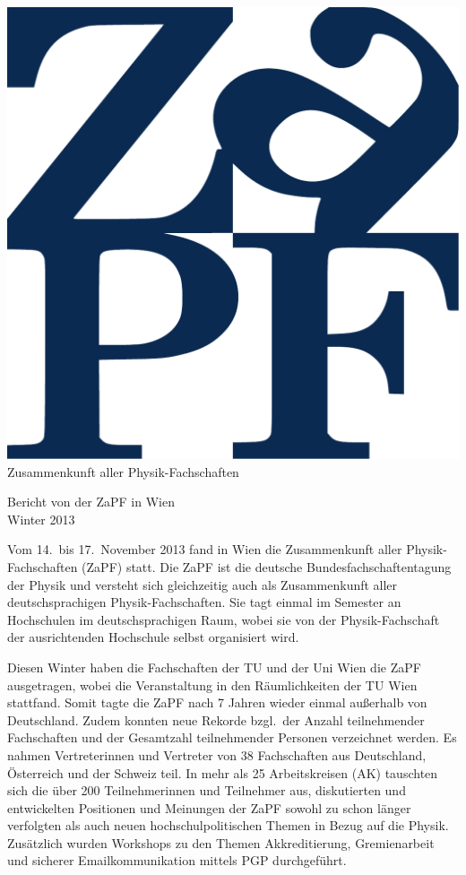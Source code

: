 \documentclass{scrartcl}
\begin{document}
\hspace{0.74\textwidth}
\begin{minipage}{0.25\textwidth}
\vspace{-1cm}
\centering
\includegraphics[width=.89\textwidth]{logo.pdf}
\small Zusammenkunft aller Physik-Fachschaften
\end{minipage}
 
\begin{center}
\vspace{1.5cm}
\huge{Bericht von der ZaPF in Wien \\ Winter 2013} 
\vspace{1cm}
\end{center}

Vom 14.\ bis 17.\ November 2013 fand in Wien die Zusammenkunft aller Physik-Fachschaften (ZaPF) statt. Die ZaPF ist die deutsche Bundesfachschaftentagung der Physik und versteht sich gleichzeitig auch als Zusammenkunft aller deutschsprachigen Physik-Fachschaften. Sie tagt einmal im Semester an Hochschulen im deutschsprachigen Raum, wobei sie von der  Physik-Fachschaft der ausrichtenden Hochschule selbst organisiert wird.

Diesen Winter haben die Fachschaften der TU und der Uni Wien die ZaPF ausgetragen, wobei die Veranstaltung in den R\"aumlichkeiten der TU Wien stattfand. Somit tagte die ZaPF nach 7 Jahren wieder einmal au\ss erhalb von Deutschland. Zudem konnten neue Rekorde bzgl.\ der Anzahl teilnehmender Fachschaften und der Gesamtzahl teilnehmender Personen verzeichnet werden. Es nahmen Vertreterinnen und Vertreter von 38 Fachschaften aus Deutschland, \"Osterreich und der Schweiz teil. In mehr als 25 Arbeitskreisen (AK) tauschten sich die \"uber 200 Teilnehmerinnen und Teilnehmer aus, diskutierten und entwickelten Positionen und Meinungen der ZaPF sowohl zu schon l\"anger verfolgten als auch neuen hochschulpolitischen Themen in Bezug auf die Physik. Zus\"atzlich wurden Workshops zu den Themen Akkreditierung, Gremienarbeit und sicherer Emailkommunikation mittels PGP durchgef\"uhrt.
\end{document}
